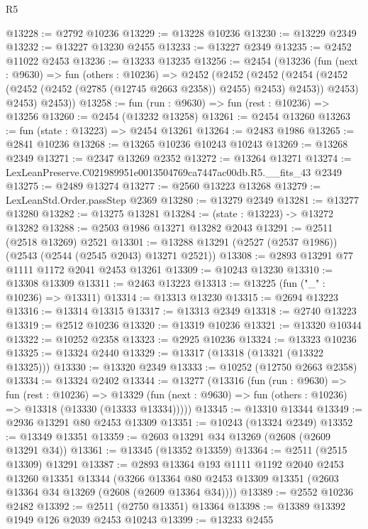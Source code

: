 \begin{lexlean}{R5}
\begin{coremodule}
@13228 := @2792 @10236
@13229 := @13228 @10236
@13230 := @13229 @2349
@13232 := @13227 @13230 @2455
@13233 := @13227 @2349
@13235 := @2452 @11022 @2453
@13236 := @13233 @13235
@13256 := @2454
    (@13236
      (fun (next : @9630) =>
      fun (others : @10236) =>
      @2452
        (@2452
          (@2452
            (@2454 (@2452 (@2452 (@2452 (@2785 (@12745 @2663 @2358)) @2455) @2453) @2453))
            @2453)
          @2453)
        @2453))
@13258 := fun (run : @9630) => fun (rest : @10236) => @13256
@13260 := @2454 (@13232 @13258)
@13261 := @2454 @13260
@13263 := fun (state : @13223) => @2454 @13261
@13264 := @2483 @1986
@13265 := @2841 @10236
@13268 := @13265 @10236 @10243 @10243
@13269 := @13268 @2349
@13271 := @2347 @13269 @2352
@13272 := @13264 @13271
@13274 := LexLeanPreserve.C021989951e0013504769ca7447ac00db.R5.__fits_43 @2349
@13275 := @2489 @13274
@13277 := @2560 @13223 @13268
@13279 := LexLeanStd.Order.passStep @2369
@13280 := @13279 @2349
@13281 := @13277 @13280
@13282 := @13275 @13281
@13284 := (state : @13223) -> @13272 @13282
@13288 := @2503 @1986 @13271 @13282 @2043
@13291 := @2511 (@2518 @13269) @2521
@13301 := @13288 @13291 (@2527 (@2537 @1986)) (@2543 (@2544 (@2545 @2043) @13271 @2521))
@13308 := @2893 @13291 @77 @1111 @1172 @2041 @2453 @13261
@13309 := @10243 @13230
@13310 := @13308 @13309
@13311 := @2463 @13223
@13313 := @13225 (fun ("_" : @10236) => @13311)
@13314 := @13313 @13230
@13315 := @2694 @13223
@13316 := @13314 @13315
@13317 := @13313 @2349
@13318 := @2740 @13223
@13319 := @2512 @10236
@13320 := @13319 @10236
@13321 := @13320 @10344
@13322 := @10252 @2358
@13323 := @2925 @10236
@13324 := @13323 @10236
@13325 := @13324 @2440
@13329 := @13317 (@13318 (@13321 (@13322 @13325)))
@13330 := @13320 @2349
@13333 := @10252 (@12750 @2663 @2358)
@13334 := @13324 @2402
@13344 := @13277
    (@13316
      (fun (run : @9630) =>
      fun (rest : @10236) =>
      @13329 (fun (next : @9630) => fun (others : @10236) => @13318 (@13330 (@13333 @13334)))))
@13345 := @13310 @13344
@13349 := @2936 @13291 @80 @2453 @13309
@13351 := @10243 (@13324 @2349)
@13352 := @13349 @13351
@13359 := @2603 @13291 @34 @13269 (@2608 (@2609 @13291 @34))
@13361 := @13345 (@13352 @13359)
@13364 := @2511 (@2515 @13309) @13291
@13387 := @2893
    @13364
    @193
    @1111
    @1192
    @2040
    @2453
    @13260
    @13351
    @13344
    (@3266 @13364 @80 @2453 @13309 @13351 (@2603 @13364 @34 @13269 (@2608 (@2609 @13364 @34))))
@13389 := @2552 @10236 @2482
@13392 := @2511 (@2750 @13351) @13364
@13398 := @13389 @13392 @1949 @126 @2039 @2453 @10243
@13399 := @13233 @2455

\end{coremodule}
\end{lexlean}
